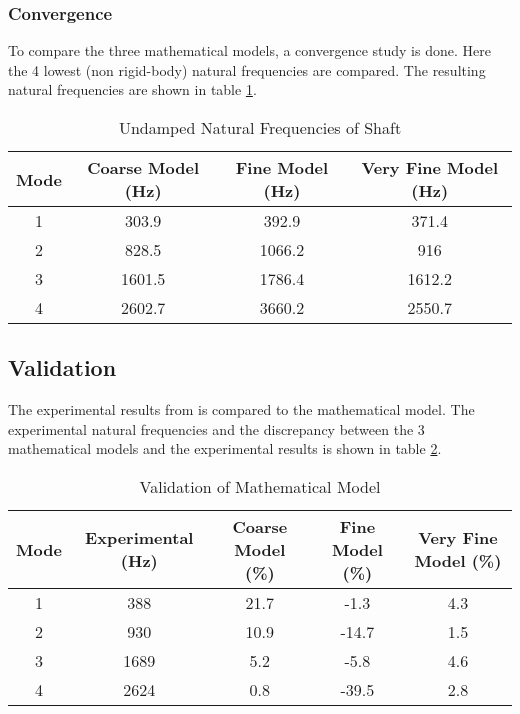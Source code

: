 \subsubsection{Convergence}
To compare the three mathematical models, a convergence study is done. Here the 4 lowest (non rigid-body) natural frequencies are compared.
The resulting natural frequencies are shown in table \ref{tab:natural_freq}.
\begin{table}[ht]
    \centering
    \caption{Undamped Natural Frequencies of Shaft}
    \label{tab:natural_freq}
    \begin{tabular}{@{}cccc@{}}
        \toprule
        Mode    &   Coarse Model (\si{\hertz})    &   Fine Model (\si{\hertz})  &   Very Fine Model (\si{\hertz}) \\ \midrule
        1       &   303.9   &   392.9   &   371.4   \\
        2       &   828.5   &   1066.2  &   916     \\
        3       &   1601.5  &   1786.4  &   1612.2  \\
        4       &   2602.7  &   3660.2  &   2550.7  \\ \bottomrule
    \end{tabular}
\end{table}

\subsection{Validation}
The experimental results from \cite[6]{Problem} is compared to the mathematical model. The experimental natural frequencies and the discrepancy between the 3 mathematical models and the experimental results is shown in table \ref{tab:validation}.

\begin{table}[ht]
    \centering
    \caption{Validation of Mathematical Model}
    \label{tab:validation}
    \begin{adjustwidth}{-0.5cm}{-0.5cm}        
    \begin{tabular}{@{}ccccc@{}}
        \toprule
        Mode    &   Experimental (\si{\hertz})    &   Coarse Model (\si{\percent})    &   Fine Model (\si{\percent})  &   Very Fine Model (\si{\percent}) \\ \midrule
        1       &   388     &   21.7   &   -1.3   &   4.3   \\
        2       &   930     &   10.9   &   -14.7  &   1.5     \\
        3       &   1689    &   5.2  &   -5.8  &   4.6  \\
        4       &   2624    &   0.8  &   -39.5  &   2.8  \\ \bottomrule
    \end{tabular}
    \end{adjustwidth}
\end{table}


